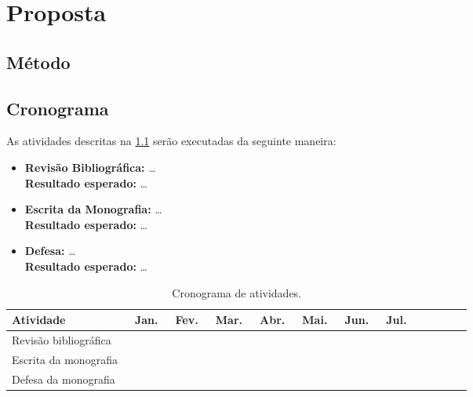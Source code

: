 \chapter{Proposta}
\label{chapter:proposta}

%

\section{Método}




\section{Cronograma}
\label{sec:cronograma}

As atividades descritas na \cref{tab:Cronograma} serão executadas da seguinte maneira:

\begin{itemize}
	\item \textbf{Revisão Bibliográfica:} \ldots
	\\\textbf{Resultado esperado:} \ldots
	
	\item \textbf{Escrita da Monografia:} \ldots
	\\\textbf{Resultado esperado:} \ldots
	
	\item \textbf{Defesa:} \ldots
	\\\textbf{Resultado esperado:} \ldots
\end{itemize}

\begin{table}[h]
	\footnotesize
	\caption{Cronograma de atividades.}
	\label{tab:Cronograma}
	\setlength{\tabcolsep}{0pt}
	\centering
	\begin{tabular}{|p{9cm}|c|c|c|c|c|c|c|c|c|c|c|c|}
		\hline
		\textbf{Atividade} 	&\ Jan. &\ Fev. &\ Mar. &\ Abr. &\ Mai. &\ Jun. &\ Jul. \\\hline
		Revisão bibliográfica       & \y    & \y    &\y     &\y      &\y      &\y      &\n    \\\hline
		Escrita da monografia       & \n    & \n    & \y    & \y     & \y     & \y     & \n   \\\hline
		Defesa da monografia        & \n    & \n    & \n    & \n     & \n     & \n     & \y   \\\hline
	\end{tabular}
\end{table}

